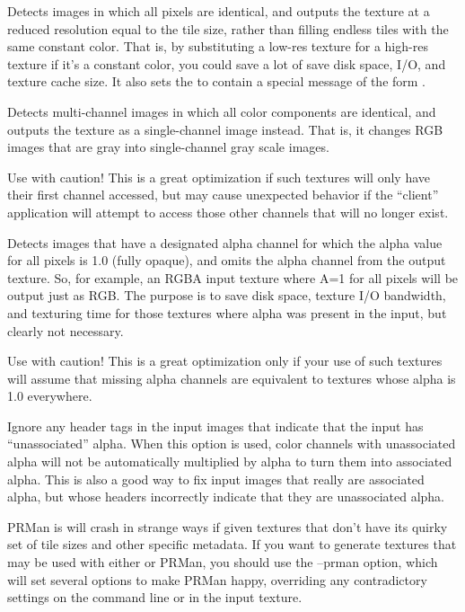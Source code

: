 Detects images in which all pixels are identical, and outputs the
texture at a reduced resolution equal to the tile size, rather than
filling endless tiles with the same constant color.  That is, by
substituting a low-res texture for a high-res texture if it's a constant
color, you could save a lot of save disk space, I/O, and texture cache size.
It also sets the  to contain a
special message of the form .  
\apiend

Detects multi-channel images in which all color components are
identical, and outputs the texture as a single-channel image instead.
That is, it changes RGB images that are gray into single-channel gray
scale images.

Use with caution!  This is a great optimization if such textures will
only have their first channel accessed, but may cause unexpected behavior
if the ``client'' application will attempt to access those other
channels that will no longer exist.
\apiend

Detects images that have a designated alpha channel for which the alpha value
for all pixels is 1.0 (fully opaque), and omits the alpha channel from
the output texture.  So, for example, an RGBA input texture where A=1
for all pixels will be output just as RGB.  The purpose is to save disk
space, texture I/O bandwidth, and texturing time for those textures
where alpha was present in the input, but clearly not necessary.

Use with caution!  This is a great optimization only if your use of such
textures will assume that missing alpha channels are equivalent to
textures whose alpha is 1.0 everywhere.
\apiend

Ignore any header tags in the input images that indicate that the
input has ``unassociated'' alpha.  When this option is used, color
channels with unassociated alpha will not be automatically multiplied
by alpha to turn them into associated alpha. This is also a good way
to fix input images that really are associated alpha, but whose headers
incorrectly indicate that they are unassociated alpha. 
\apiend

PRMan is will crash in strange ways if given textures that don't have
its quirky set of tile sizes and other specific metadata.  If you want
\maketx to generate textures that may be used with either \OpenImageIO
or PRMan, you should use the {\cf --prman} option, which will set
several options to make PRMan happy, overriding any contradictory
settings on the command line or in the input texture.  

